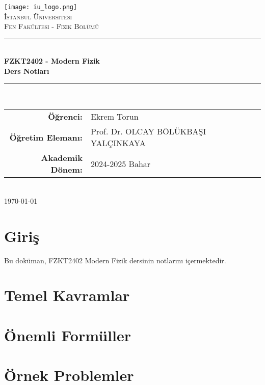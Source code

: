 \documentclass[12pt,a4paper]{article}
\begin{document}
\begin{titlepage}
    \centering
    \texttt{[image: iu\_logo.png]}\\[1cm]
    {\scshape\LARGE İstanbul Üniversitesi\\}
    {\scshape\Large Fen Fakültesi - Fizik Bölümü\\[0.5cm]}
    \rule{\linewidth}{0.2mm} \\[0.4cm]
    { \huge \bfseries FZKT2402 - Modern Fizik\\
    Ders Notları\\[0.4cm] }
    \rule{\linewidth}{0.2mm} \\[1.5cm]
    
    {\large
    \begin{tabular}{rl}
        \textbf{Öğrenci:} & Ekrem Torun \\
        \textbf{Öğretim Elemanı:} & Prof. Dr. OLCAY BÖLÜKBAŞI YALÇINKAYA \\
        \textbf{Akademik Dönem:} & 2024-2025 Bahar \\
    \end{tabular}}\\[2cm]
    
    {\large \today}
\end{titlepage}

\tableofcontents
\newpage

\section{Giriş}
Bu doküman, FZKT2402 Modern Fizik dersinin notlarını içermektedir.

\section{Temel Kavramlar}

\section{Önemli Formüller}

\section{Örnek Problemler}
\end{document}
